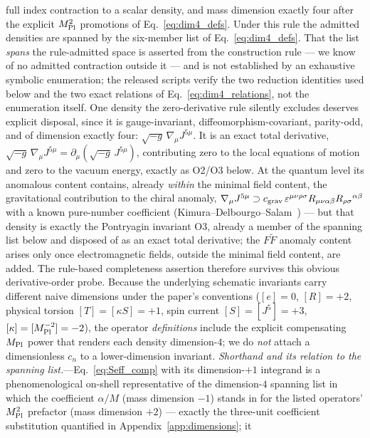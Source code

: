 \documentclass[aps,prd,twocolumn,superscriptaddress,showpacs,preprintnumbers,nofootinbib,longbibliography,floatfix]{revtex4-2}
\newcommand{\MPl}{M_{\rm Pl}}
\begin{document}
full index contraction to a scalar density, and mass dimension exactly
four after the explicit $\MPl^{2}$ promotions of
Eq.~\eqref{eq:dim4_defs}. Under this rule the admitted densities are
spanned by the six-member list
of Eq.~\eqref{eq:dim4_defs}. That the list \emph{spans} the rule-admitted
space is asserted from the construction rule --- we know of no admitted
contraction outside it
--- and is not established by an exhaustive symbolic enumeration; the
released scripts verify the two reduction identities used below and the
two exact relations of Eq.~\eqref{eq:dim4_relations}, not the enumeration
itself. One density the zero-derivative rule silently
excludes deserves explicit disposal, since it is gauge-invariant,
diffeomorphism-covariant, parity-odd, and of dimension exactly four:
$\sqrt{-g}\,\nabla_\mu J^{5\mu}$. It is an exact total derivative,
$\sqrt{-g}\,\nabla_\mu J^{5\mu}=\partial_\mu(\sqrt{-g}\,J^{5\mu})$,
contributing zero to the local equations of motion and zero to the
vacuum energy, exactly as O2/O3 below. At the quantum level its anomalous
content contains, already \emph{within} the minimal field content, the
gravitational contribution to the chiral anomaly,
$\nabla_\mu J^{5\mu}\supset c_{\rm grav}\,
\varepsilon^{\mu\nu\rho\sigma}R_{\mu\nu\alpha\beta}R_{\rho\sigma}{}^{\alpha\beta}$
with a known pure-number coefficient
(Kimura--Delbourgo--Salam~\cite{Kimura1969,DelbourgoSalam1972}) --- but
that density is exactly the Pontryagin invariant O3, already a member of
the spanning list below and disposed of as an exact total derivative; the
$F\widetilde F$ anomaly content arises only once electromagnetic fields,
outside the minimal field content, are added. The rule-based
completeness assertion therefore survives this obvious derivative-order
probe.
Because the underlying schematic invariants carry different naive
dimensions under the paper's conventions ($[e]=0$, $[R]=+2$, physical
torsion $[T]=[\kappa S]=+1$, spin current $[S]=[J^5]=+3$,
$[\kappa]=[\MPl^{-2}]=-2$), the operator \emph{definitions} include the
explicit compensating $\MPl$ power that renders each density dimension-$4$;
we do \emph{not} attach a dimensionless $c_n$ to a lower-dimension
invariant.
\emph{Shorthand and its relation to the spanning list.}---Eq.~\eqref{eq:Seff_comp}
with its dimension-$+1$ integrand is a phenomenological on-shell
representative of the dimension-$4$ spanning list in which the coefficient
$\alpha/M$ (mass dimension $-1$) stands in for the listed operators'
$\MPl^{2}$ prefactor (mass dimension $+2$) --- exactly the three-unit
coefficient substitution quantified in Appendix~\ref{app:dimensions}; it
\end{document}
